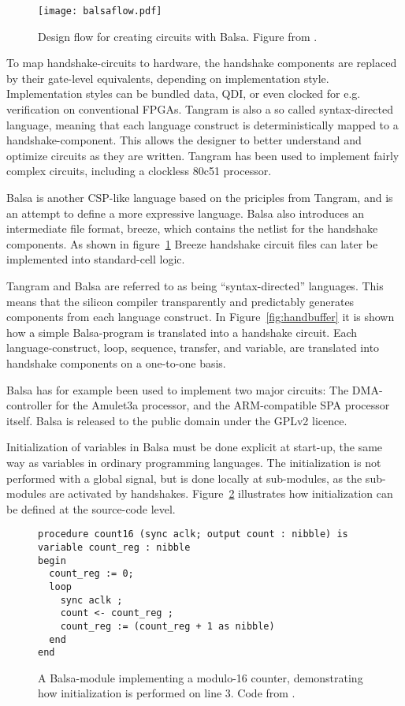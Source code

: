 \begin{figure}[htbp]
  \centering
  \texttt{[image: balsaflow.pdf]}
  \caption{Design flow for creating circuits with Balsa. Figure from
    \cite{tut}.}
  \label{fig:balsaflow}
\end{figure}


To map handshake-circuits to hardware, the handshake components are
replaced by their gate-level equivalents, depending on implementation
style. Implementation styles can be bundled data, QDI, or even clocked
for e.g. verification on conventional FPGAs. Tangram is also a so
called syntax-directed language, meaning that each language construct
is deterministically mapped to a handshake-component. This allows the
designer to better understand and optimize circuits as they are
written. Tangram has been used to implement fairly complex circuits,
including a clockless 80c51 processor\cite{80c51}.

Balsa\cite{tut} is another CSP-like language based on the priciples
from Tangram, and is an attempt to define a more expressive
language. Balsa also introduces an intermediate file format, breeze,
which contains the netlist for the handshake components. As shown in
figure~\ref{fig:balsaflow} Breeze handshake circuit files can later be
implemented into standard-cell logic.

Tangram and Balsa are referred to as being ``syntax-directed''
languages. This means that the silicon compiler transparently and
predictably generates components from each language construct. In
Figure~\ref{fig:handbuffer} it is shown how a simple Balsa-program is
translated into a handshake circuit. Each language-construct, loop,
sequence, transfer, and variable, are translated into handshake
components on a one-to-one basis.

Balsa has for example been used to implement two major circuits: The
DMA-controller for the Amulet3a processor, and the ARM-compatible SPA
processor itself. Balsa is released to the public domain under the
GPLv2 licence.

\label{par:init}
Initialization of variables in Balsa must be done explicit at
start-up, the same way as variables in ordinary programming
languages. The initialization is not performed with a global signal,
but is done locally at sub-modules, as the sub-modules are activated
by handshakes. Figure~\ref{fig:init} illustrates how initialization
can be defined at the source-code level.

\begin{figure}[htbp]
\begin{lstlisting}
procedure count16 (sync aclk; output count : nibble) is
variable count_reg : nibble
begin
  count_reg := 0;
  loop
    sync aclk ;
    count <- count_reg ;
    count_reg := (count_reg + 1 as nibble)
  end
end
\end{lstlisting}
\caption{A Balsa-module implementing a modulo-16 counter,
  demonstrating how initialization is performed on line 3. Code from
  \cite{tut}.}
\label{fig:init}
\end{figure}



